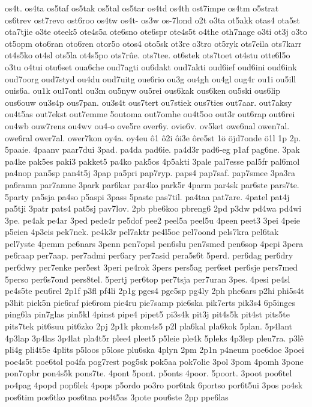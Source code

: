 {os4t.
os4ta
os5taf
os5tak
os5tal
os5tar
os4td
os4th
ost7impe
os4tm
o5strat
os6trev
ost7revo
ost6roo
os4tw
os4t-
os3w
os-7lond
o2t
o3ta
ot5akk
otas4
ota5st
ota7tjie
o3te
oteek5
ote4s5a
ote6sno
ote6spr
ote4s5t
o4the
oth7nage
o3ti
ot3j
o3to
ot5opm
oto6ran
oto6ren
otor5o
otos4
oto5sk
ot3re
o3tro
ot5ryk
ots7eila
ots7karr
ot4s5ko
ot4sl
ots5la
ot4s5po
ots7rûe.
ots7tee.
ot6stek
ots7toet
ot4stu
otte6l5o
o3tu
o4tui
otu6set
oua6che
oud7agti
ou6dakt
oud7akti
oud6ief
oud6ini
oud6ink
oud7oorg
oud7styd
ou4du
oud7uitg
oue6rio
ou3g
ou4gh
ou4gl
oug4r
ou1i
ou5ill
ouis6a.
ou1k
oul7ontl
ou3m
ou5nyw
ou5rei
ous6kak
ous6ken
ou5ski
ous6lip
ous6ouw
ou3s4p
ous7pan.
ou3s4t
ous7tert
ou7stiek
ous7ties
out7aar.
out7aksy
ou4t5as
out7ekst
out7emme
5outoma
out7omhe
ou4t5oo
out3r
out6rap
out6rei
ou4wb
ouw7rens
ou4wv
ou4-o
ove5re
over6y.
ovie6v.
ov5ket
owe6nal
owen7al.
owe6ral
ower7al.
ower7kon
oy4a.
oy4eu
ô1
ô2i
ôi3e
ôre5st
1ö
öjd7onde
ö1l
1p
2p.
5paaie.
4paanv
paar7dui
3pad.
pa4da
pad6ie.
pa4d3r
pad6-eg
p1af
pag6ne.
3pak
pa4ke
pak5es
paki3
pakket5
pa4ko
pak5os
4p5akti
3pale
pal7esse
pal5fr
pal6mol
pa4nop
pan5sp
pan4t5j
3pap
pa5pri
pap7ryp.
paps4
pap7saf.
pap7smee
3pa3ra
pa6ramn
par7amne
3park
par6kar
par4ko
park5r
4parm
par4sk
par6ste
pars7te.
5party
pa5sja
pa4so
p5aspi
3pass
5paste
pas7til.
pa4taa
pat7are.
4patel
pat4j
pa5tji
3patr
pats4
pat5sj
pav7lov.
2pb
pbe6koo
pbreng6
2pd
p3dw
pd4wa
pd4wi
3pe.
pe4ak
pe4ar
3ped
pede4r
pe5dof
pee2
peel5a
peel5u
4peen
peet3
3pei
4peie
p5eien
4p3eis
pek7nek.
pe4k3r
pel7aktr
pe4l5oe
pel7oond
pels7kra
pel6tak
pel7yste
4pemm
pe6nars
3penn
pen7opsl
pen6slu
pen7smed
pen6sop
4pepi
3pera
pe6raap
per7aap.
per7admi
per6ary
per7asid
pera5s6t
5perd.
per6dag
per6dry
per6dwy
per7enke
per5est
3peri
pe4rok
3pers
pers5ag
per6set
per6sje
pers7med
5perso
per6s7ond
pers8tel.
5pertj
per6top
per7tsja
per7uran
3pes.
4pesi
pe4sl
pe4s5te
peu6rel
2p1f
p3fl
pf4li
2p1g
pges4
pge5sp
pg4ly
2ph
phe6ars
p2hi
phi5s4t
p3hit
piek5n
pie6raf
pie6rom
pie4ru
pie7samp
pie6ska
pik7erts
pik3s4
6p5inges
ping6la
pin7glas
pin5kl
4pinst
pipe4
pipet5
pi3s4k
pit3j
pit4s5k
pit4st
pits5te
pits7tek
pit6suu
pit6zko
2pj
2p1k
pkom4s5
p2l
pla6kal
pla6kok
5plan.
5p4lant
4p3lap
3p4las
3p4lat
pla4t5r
plee4
pleet5
p5leie
ple4k
5pleks
4p3lep
pleu7ra.
p3lê
pli4g
pli4t5e
4plits
p5loos
p5lose
plu6ska
4plyn
2pm
2p1n
p4neum
poe6doe
3poei
poe4s5t
poe6tol
po4fa
pog7rest
pog5sk
pok5aa
pok7olie
3pol
3pom
4pomh
3pone
pon7opbr
pon4s5k
pons7te.
4pont
5pont.
p5onts
4poor.
5poort.
3poot
poo6tel
po4pag
4popd
pop6lek
4pops
p5ordo
po3ro
por6tak
6portso
por6t5ui
3pos
po4sk
pos6tim
pos6tko
pos6tna
po4t5as
3pote
pou6ste
2pp
ppe6las
}
